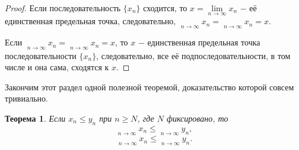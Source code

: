 \documentclass{article}
\newtheorem{theorem}{Теорема}[section]
\DeclareMathOperator*\lowlim{\underline{lim}}
\DeclareMathOperator*\uplim{\overline{lim}}
\begin{document}
\begin{proof}
Если последовательность \(\{x_n\}\) сходится, то \(x = \lim\limits_{n \to \infty}{x_n}\) \(-\) её единственная предельная точка, следовательно, \(\lowlim\limits_{n \to \infty}{x_n} = \uplim\limits_{n \to \infty}{x_n} = x\).

Если \(\lowlim\limits_{n \to \infty}{x_n} = \uplim\limits_{n \to \infty}{x_n} = x\), то \(x\) \(-\) единственная предельная точка последовательности \(\{x_n\}\), следовательно, все её подпоследовательности, в том числе и она сама, сходятся к \(x\).
\end{proof}

Закончим этот раздел одной полезной теоремой, доказательство которой совсем тривиально.

\begin{theorem}
Если \(x_n \leq y_n\) при \(n \geq N\), где \(N\) фиксировано, то
\[
\lowlim\limits_{n \to \infty}{x_n} \leq \lowlim\limits_{n \to \infty}{y_n},
\]
\[
\uplim\limits_{n \to \infty}{x_n} \leq \uplim\limits_{n \to \infty}{y_n}.
\]
\end{theorem}
\end{document}
